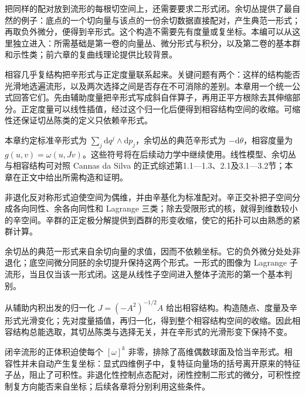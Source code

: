 把同样的配对放到流形的每根切空间上，还需要要求二形式闭。余切丛提供了最自然的例子：底点的一个切向量与该点的一份余切数据直接配对，产生典范一形式；再取负外微分，便得到辛形式。这个构造不需要先有度量或复坐标。本编可以从这里独立进入：所需基础是第一卷的向量丛、微分形式与积分，以及第二卷的基本群和示性类；前六章的复曲线理论提供比较背景。

\ProseParagraphBreak

相容几乎复结构把辛形式与正定度量联系起来。关键问题有两个：这样的结构能否光滑地选遍流形，以及两次选择之间是否存在不可消除的差别。本章用一个统一公式回答它们。先由辅助度量把辛形式写成斜自伴算子，再用正平方根除去其伸缩部分。正定度量可以线性插值，经过这个归一化后便得到相容结构空间的收缩。可缩性还保证切丛陈类的定义只依赖辛形式。

\ProseParagraphBreak

本章约定标准辛形式为 \(\sum_j\mathrm{d}q^j\wedge\mathrm{d}p_j\)，余切丛的典范辛形式为 \(-\mathrm{d}\theta\)，相容度量为 \(g(u,v)=\omega(u,Jv)\)。这些符号将在后续动力学中继续使用。线性模型、余切丛与相容结构可对照 Cannas da Silva 的正式综述第1.1—1.3、2.1及3.1—3.2节；本章在正文中给出所需构造和证明。\cite[第1.1--1.3、2.1、3.1--3.2节]{Cannas2006Symplectic}






\begin{chaptersummary}
非退化反对称形式迫使空间为偶维，并由辛基化为标准配对。辛正交补把子空间分成各向同性、余各向同性和 Lagrange 三类；除去受限形式的核，就得到维数较小的辛空间。辛群的正定极分解提供到酉群的形变收缩，使它的拓扑可以由熟悉的紧群计算。

\ProseParagraphBreak

余切丛的典范一形式来自余切向量的求值，因而不依赖坐标。它的负外微分处处非退化；底空间微分同胚的余切提升保持这两个形式。一形式的图像为 Lagrange 子流形，当且仅当该一形式闭。这是从线性子空间进入整体子流形的第一个基本判别。

\ProseParagraphBreak

从辅助内积出发的归一化 \(J=(-A^2)^{-1/2}A\) 给出相容结构。构造随点、度量及辛形式光滑变化；先对度量插值，再归一化，得到整个相容结构空间的收缩。因此相容结构总能选取，其切丛陈类与选择无关，并在辛形式的光滑形变下保持不变。

\ProseParagraphBreak

闭辛流形的正体积迫使每个 \([\omega]^k\) 非零，排除了高维偶数球面及恰当辛形式。相容性并未自动产生复坐标：显式四维例子中，复特征向量场的括号离开原来的特征子丛，阻止了可积性。非退化性控制点态配对，闭性控制二形式的微分，可积性控制复方向能否来自坐标；后续各章将分别利用这些条件。
\end{chaptersummary}

